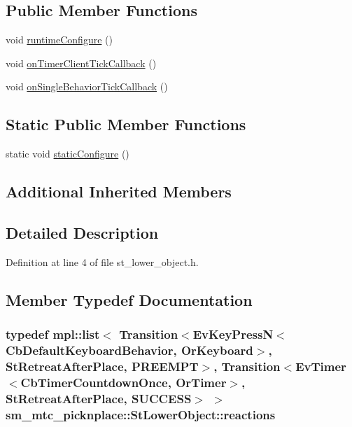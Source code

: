 \subsection*{Public Member Functions}
\begin{DoxyCompactItemize}
\item 
void \hyperlink{structsm__mtc__picknplace_1_1StLowerObject_a3564b5a351c681099f4ab3b5dd57d684}{runtime\+Configure} ()
\item 
void \hyperlink{structsm__mtc__picknplace_1_1StLowerObject_a3acad26ffd04856952d9f8d2095b4b41}{on\+Timer\+Client\+Tick\+Callback} ()
\item 
void \hyperlink{structsm__mtc__picknplace_1_1StLowerObject_afe0b5cce40b1d6d0359a1bd78f350c41}{on\+Single\+Behavior\+Tick\+Callback} ()
\end{DoxyCompactItemize}
\subsection*{Static Public Member Functions}
\begin{DoxyCompactItemize}
\item 
static void \hyperlink{structsm__mtc__picknplace_1_1StLowerObject_ac75a4099780bd73603a0c8038cf6096b}{static\+Configure} ()
\end{DoxyCompactItemize}
\subsection*{Additional Inherited Members}


\subsection{Detailed Description}


Definition at line 4 of file st\+\_\+lower\+\_\+object.\+h.



\subsection{Member Typedef Documentation}
\subsubsection[{\texorpdfstring{reactions}{reactions}}]{\setlength{\rightskip}{0pt plus 5cm}typedef mpl\+::list$<$ Transition$<$Ev\+Key\+PressN$<$Cb\+Default\+Keyboard\+Behavior, {\bf Or\+Keyboard}$>$, {\bf St\+Retreat\+After\+Place}, {\bf P\+R\+E\+E\+M\+PT}$>$, Transition$<$Ev\+Timer$<$Cb\+Timer\+Countdown\+Once, {\bf Or\+Timer}$>$, {\bf St\+Retreat\+After\+Place}, {\bf S\+U\+C\+C\+E\+SS}$>$ $>$ {\bf sm\+\_\+mtc\+\_\+picknplace\+::\+St\+Lower\+Object\+::reactions}}\hypertarget{structsm__mtc__picknplace_1_1StLowerObject_a82883e4de896be1fbae56dbe2c76528b}{}\label{structsm__mtc__picknplace_1_1StLowerObject_a82883e4de896be1fbae56dbe2c76528b}


